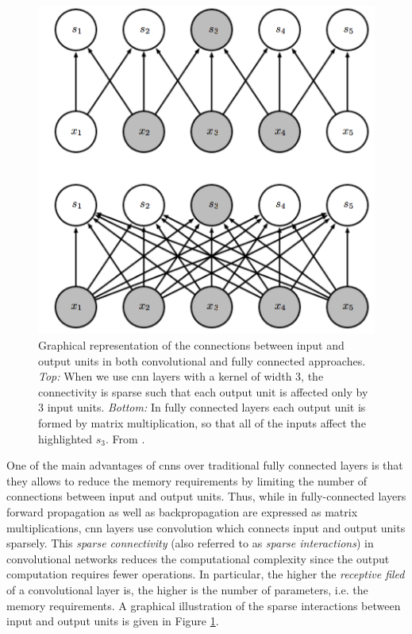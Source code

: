 \begin{figure}[H]
	\begin{center}
		\includegraphics[scale=.5]{img/sparse_interactions.png}
		\captionsetup{margin=2cm}
		\caption{Graphical representation of the connections between input and output units in both convolutional and fully connected approaches. \textit{Top:} When we use \gls{cnn} layers with a kernel of width 3, the connectivity is sparse such that each output unit is affected only by 3 input units. \textit{Bottom:} In fully connected layers each output unit is formed by matrix multiplication, so that all of the inputs affect the highlighted $s_3$.
			From \cite{goodfellow2016deep}.}
		\label{fig:sparse_interactions}
	\end{center}
\end{figure}
\noindent One of the main advantages of \gls{cnn}s over traditional fully connected layers is that they allows to reduce the memory requirements by limiting the number of connections between input and output units. Thus, while in fully-connected layers forward propagation as well as backpropagation are expressed as matrix multiplications, \gls{cnn} layers use convolution which connects input and output units sparsely. This \textit{sparse connectivity} (also referred to as \textit{sparse interactions}) in convolutional networks reduces the computational complexity since the output computation requires fewer operations. In particular, the higher the \textit{receptive filed} of a convolutional layer is, the higher is the number of parameters, i.e. the memory requirements. A graphical illustration of the sparse interactions between input and output units is given in Figure \ref{fig:sparse_interactions}. \\
